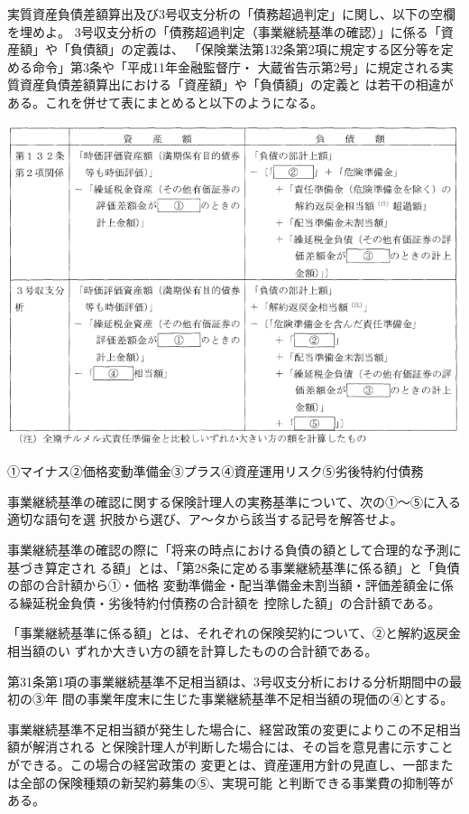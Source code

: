 \documentclass[report,gutter=10mm,fore-edge=10mm,uplatex,dvipdfmx]{jlreq}
\begin{document}

実質資産負債差額算出及び3号収支分析の「債務超過判定」に関し、以下の空欄を埋めよ。
3号収支分析の「債務超過判定（事業継続基準の確認）」に係る「資産額」や「負債額」の定義は、
「保険業法第132条第2項に規定する区分等を定める命令」第3条や「平成11年金融監督庁・
大蔵省告示第2号」に規定される実質資産負債差額算出における「資産額」や「負債額」の定義と
は若干の相違がある。これを併せて表にまとめると以下のようになる。

\includegraphics[scale=0.8]{./images/ProbH19-2-1-2.png}

\answer{}
①マイナス②価格変動準備金③プラス④資産運用リスク⑤劣後特約付債務


事業継続基準の確認に関する保険計理人の実務基準について、次の①〜⑤に入る適切な語句を選
択肢から選び、ア〜タから該当する記号を解答せよ。

事業継続基準の確認の際に「将来の時点における負債の額として合理的な予測に基づき算定され
る額」とは、「第28条に定める事業継続基準に係る額」と「負債の部の合計額から①・価格
変動準備金・配当準備金未割当額・評価差額金に係る繰延税金負債・劣後特約付債務の合計額を
控除した額」の合計額である。

「事業継続基準に係る額」とは、それぞれの保険契約について、②と解約返戻金相当額のい
ずれか大きい方の額を計算したものの合計額である。

第31条第1項の事業継続基準不足相当額は、3号収支分析における分析期間中の最初の③年
間の事業年度末に生じた事業継続基準不足相当額の現価の④とする。

事業継続基準不足相当額が発生した場合に、経営政策の変更によりこの不足相当額が解消される
と保険計理人が判断した場合には、その旨を意見書に示すことができる。この場合の経営政策の
変更とは、資産運用方針の見直し、一部または全部の保険種類の新契約募集の⑤、実現可能
と判断できる事業費の抑制等がある。
\end{document}
